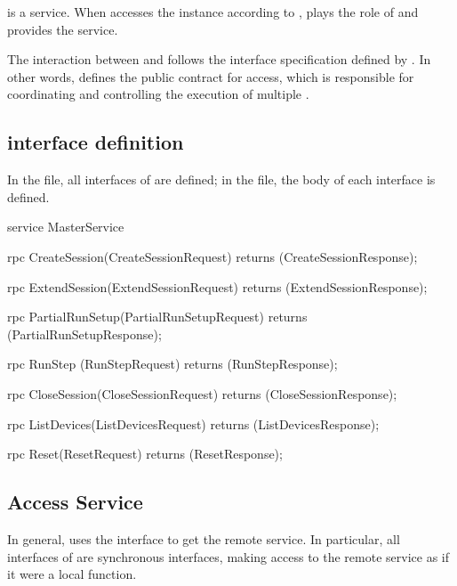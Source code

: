 \begin{content}

 is a  service. When  accesses the  instance according to ,  plays the role of  and provides the  service.

The interaction between  and  follows the interface specification defined by . In other words,  defines the public contract for  access, which is responsible for coordinating and controlling the execution of multiple .

\subsection{interface definition}

In the  file, all interfaces of  are defined; in the  file, the body of each interface is defined.

\begin{leftbar}
\begin{c++}
service MasterService {
  rpc CreateSession(CreateSessionRequest) 
      returns (CreateSessionResponse);
  
  rpc ExtendSession(ExtendSessionRequest) 
      returns (ExtendSessionResponse);

  rpc PartialRunSetup(PartialRunSetupRequest) 
      returns (PartialRunSetupResponse);

  rpc RunStep (RunStepRequest) 
      returns (RunStepResponse);
  
  rpc CloseSession(CloseSessionRequest) 
      returns (CloseSessionResponse);
  
  rpc ListDevices(ListDevicesRequest) 
      returns (ListDevicesResponse);

  rpc Reset(ResetRequest) 
      returns (ResetResponse);
}
\end{c++}
\end{leftbar}

\subsection{Access Service}

In general,  uses the interface  to get the remote  service. In particular, all interfaces of  are synchronous interfaces, making  access to the remote  service as if it were a local function.


\end{content}
